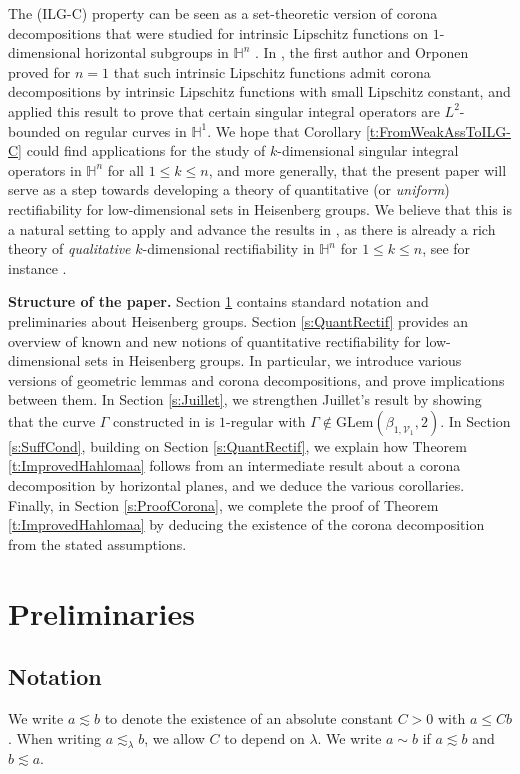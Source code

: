 \documentclass[12pt]{amsart}
\numberwithin{equation}{section}
\theoremstyle{plain}
\theoremstyle{definition}
\theoremstyle{remark}
\begin{document}
The (ILG-C) property can be seen as a set-theoretic version of corona decompositions that were studied for intrinsic Lipschitz functions on $1$-dimensional horizontal subgroups in $\mathbb{H}^n$ \cite{FO,didonato}. 
In \cite[\S 3.1.1]{FO}, the first author and Orponen proved for $n=1$ that such intrinsic Lipschitz functions  admit corona decompositions by intrinsic Lipschitz functions with small Lipschitz constant, and applied this result to prove that certain singular integral operators are $L^2$-bounded on regular curves in $\mathbb{H}^1$. 
We hope that Corollary \ref{t:FromWeakAssToILG-C} could find applications for the study of $k$-dimensional singular integral operators in $\mathbb{H}^n$ for all $1\leq k\leq n$, and more generally, that the present paper will serve as a step towards developing a theory of quantitative (or \emph{uniform}) rectifiability for low-dimensional sets in Heisenberg groups. We believe that this is a natural setting to apply and advance the results in \cite{Bate}, as there is already a  rich theory of \emph{qualitative} $k$-dimensional rectifiability in $\mathbb{H}^n$ for $1\leq k\leq n$, see for instance \cite{MR2789472,MR4405432}.

\medskip


\textbf{Structure of the paper.} Section \ref{s:Prelim} contains standard notation and preliminaries about Heisenberg groups. Section \ref{s:QuantRectif} provides an overview of known and new notions of quantitative rectifiability for low-dimensional sets in Heisenberg groups. In particular, we introduce various versions of geometric lemmas and corona decompositions, and prove implications between them. In Section \ref{s:Juillet}, 
we strengthen Juillet's result by showing that the curve $\Gamma$ constructed in \cite{Juillet} is $1$-regular with $\Gamma\notin \mathrm{GLem}(\beta_{1,\mathcal{V}_1},2)$. In Section
\ref{s:SuffCond}, building on  Section \ref{s:QuantRectif},
we explain how Theorem \ref{t:ImprovedHahlomaa} follows from 
an intermediate result about a corona decomposition by horizontal planes, and we deduce the various corollaries. 
Finally, in Section \ref{s:ProofCorona}, we complete the proof of Theorem \ref{t:ImprovedHahlomaa}  by deducing the existence of the corona decomposition from the stated assumptions. 

\section{Preliminaries}\label{s:Prelim}
\subsection{Notation} 
We write $a\lesssim b$ to denote the existence of an absolute constant $C>0$ with $a\leq Cb$. When writing $a\lesssim_\lambda b$, we allow $C$ to depend on $\lambda$. We write $a\sim b$ if $a\lesssim b$ and $b\lesssim a$.
\end{document}
